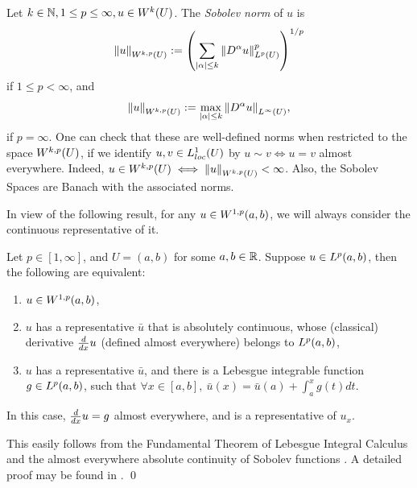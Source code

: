 \documentclass{ifacconf}
\begin{document}
\begin{defn}
    Let $k \in {\mathbb{N}}, 1 \leq p \leq \infty, u \in {W^{k}_{}{\left ( U \right )}}$.
    The \textit{Sobolev norm} of $u$ is $${\left\| u\right\|}_{W^{k,p}(U)} := {\left ( \sum_{{\left\vert \alpha \right\vert} \leq k}{\left\| D^\alpha u\right\|}_{{L^p{\left ( U \right )}}}^p \right )}^{1/p}$$ if $1 \leq p < \infty$, and $${\left\| u\right\|}_{W^{k,p}(U)} := \max_{{\left\vert \alpha \right\vert} \leq k}{\left\| D^\alpha u\right\|}_{L^\infty(U)},$$ if $p = \infty$.
    One can check that these are well-defined norms when restricted to the space ${W^{k,p}_{}{\left ( U \right )}}$, if we identify $u,v \in {L^{1}_{loc}{\left ( U \right )}}$ by $u\sim v \iff u=v$ almost everywhere. Indeed, $u \in {W^{k,p}_{}{\left ( U \right )}} \iff {\left\| u\right\|}_{W^{k,p}_{}{\left ( U \right )}} < \infty$. Also, the Sobolev Spaces are Banach with the associated norms.
\end{defn}

In view of the following result, for any $u \in {W^{1,p}_{}{\left ( a,b \right )}}$, we will always consider the continuous representative of it.

\begin{thm}
    \label{Fundamental Theorem of Lebesgue Integral Calculus with Weak Derivative}
    Let $p \in [1,\infty]$, and $U = (a,b)$ for some $a,b \in {\mathbb{R}}$. Suppose $u \in {L^{p}_{}{\left ( a,b \right )}}$, then the following are equivalent:
    \begin{enumerate}[label=\roman*]
        \item $u \in {W^{1,p}_{}{\left ( a,b \right )}}$,
        \item $u$ has a representative $\bar{u}$ that is absolutely continuous, whose (classical) derivative $\frac{d}{d x}\relax{u}$ (defined almost everywhere) belongs to ${L^{p}_{}{\left ( a,b \right )}}$,
        \item $u$ has a representative $\bar{u}$, and there is a Lebesgue integrable function $g \in {L^{p}_{}{\left ( a,b \right )}}$, such that $\forall x \in [a,b],~ \bar{u}(x) = \bar{u}(a) + \int_a^xg(t)dt.$
    \end{enumerate}
    In this case, $\frac{d}{d x}\relax{u} = g$ almost everywhere, and is a representative of $u_x$.
\begin{pf}
    This easily follows from the Fundamental Theorem of Lebesgue Integral Calculus \cite[Theorem~6.10~and~Corollary~6.12]{royden_real_1993} and the almost everywhere absolute continuity of Sobolev functions \cite[Theorem~2.1.4]{ziemer_weakly_1989}. A detailed proof may be found in \cite[Corollary~2.1.13]{yixing_multiplicative_2025}. \qed
\end{pf}
\end{thm}
\end{document}
